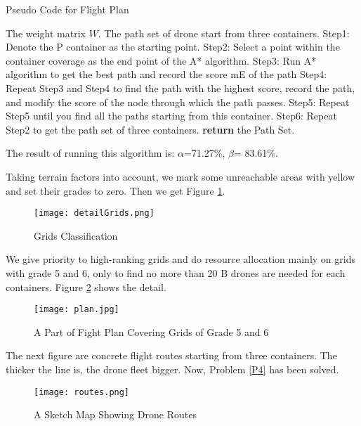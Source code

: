 \documentclass{mcmthesis}
\begin{document}
     	    \begin{algorithm}
 	\label{al4}
 	\renewcommand{\algorithmicrequire}{\textbf{Input:}}
 	\renewcommand{\algorithmicensure}{\textbf{Output: }}
 	\caption{Pseudo Code for Flight Plan}
 	\begin{algorithmic}[2]
 		\REQUIRE  The weight matrix $W$.
 		\ENSURE The path set of drone start from three containers. 
 		\STATE  Step1: Denote the P container as the starting point. 
 		\STATE Step2: Select a point within the container coverage as the end point of the A* algorithm. 
 		\STATE Step3: Run A* algorithm to get the best path and record the score mE of the path 
 		\STATE Step4: Repeat Step3 and Step4 to find the path with the highest score, record the path, and modify the score of the node through which the path passes. 
 		\STATE Step5: Repeat Step5 until you find all the paths starting from this container. 
 		\STATE Step6: Repeat Step2 to get the path set of three containers. 
 		\STATE \textbf{return} the Path Set.
 	\end{algorithmic}  
 \end{algorithm}
The result of running this algorithm is: $\alpha$=71.27\%, $\beta$= 83.61\%.

Taking terrain factors into account, we mark some unreachable areas with yellow and set their grades to zero. Then we get Figure \ref{gcla}.
 \begin{figure}[H]                                         
 	\centering
 	\texttt{[image: detailGrids.png]}        
 	\caption{Grids Classification}                          
 	\label{gcla}                                          
 \end{figure}
We give priority to high-ranking grids and do resource allocation mainly on grids with grade 5 and 6, only to find no more than 20 B drones are needed for each containers. Figure \ref{pfp} shows the detail. 
\begin{figure}[H]                                         
	\centering
	\texttt{[image: plan.jpg]}        
	\caption{A Part of Fight Plan Covering Grids of Grade 5 and 6}                          
	\label{pfp}                                          
\end{figure}
    
    The next figure are concrete flight routes starting from three containers. The thicker the line is, the drone fleet bigger. \textcolor[rgb]{1.00,0.00,0.00}{Now, Problem \ref{P4} has been solved.}   
    \begin{figure}[H]                                         
    	\centering
    	\texttt{[image: routes.png]}        
    	\caption{A Sketch Map Showing Drone Routes}                          
    	\label{pfpss}                                          
    \end{figure}
    
\end{document}
